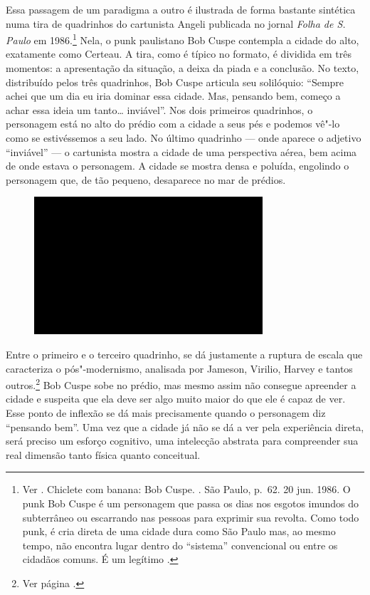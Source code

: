 Essa passagem de um paradigma a outro é ilustrada de forma bastante
sintética numa tira de quadrinhos do cartunista Angeli publicada no
jornal \emph{Folha de S. Paulo} em 1986.\footnote{Ver . Chiclete
  com banana: Bob Cuspe. {}. São Paulo, p.~62.
  20 jun. 1986. O punk Bob Cuspe é um personagem que passa os dias nos
  esgotos imundos do subterrâneo ou escarrando nas pessoas para exprimir
  sua revolta. Como todo punk, é cria direta de uma cidade dura como São
  Paulo mas, ao mesmo tempo, não encontra lugar dentro do ``sistema''
  convencional ou entre os cidadãos comuns. É um legítimo
  {}.} Nela, o punk paulistano Bob Cuspe contempla a cidade
do alto, exatamente como Certeau. A tira, como é típico no formato, é
dividida em três momentos: a apresentação da situação, a deixa da piada
e a conclusão. No texto, distribuído pelos três quadrinhos, Bob Cuspe
articula seu solilóquio: ``Sempre achei que um dia eu iria dominar essa
cidade. Mas, pensando bem, começo a achar essa ideia um
tanto\ldots{} inviável''. Nos dois primeiros quadrinhos, o personagem
está no alto do prédio com a cidade a seus pés e podemos vê"-lo como se
estivéssemos a seu lado. No último quadrinho --- onde aparece o adjetivo
``inviável'' --- o cartunista mostra a cidade de uma perspectiva aérea,
bem acima de onde estava o personagem. A cidade se mostra densa e
poluída, engolindo o personagem que, de tão pequeno, desaparece no mar
de prédios.

\begin{figure}[!ht]

\centering
 \includegraphics[width=85mm]{./imgs/im1.jpg}
\caption{\tiny{}}

\end{figure}

Entre o primeiro e o terceiro quadrinho, se dá justamente a ruptura de
escala que caracteriza o pós"-modernismo, analisada por Jameson, Virilio,
Harvey e tantos outros.\footnote{Ver página \pageref{ruptura}.} Bob Cuspe sobe no prédio, mas mesmo assim não
consegue apreender a cidade e suspeita que ela deve ser algo muito maior
do que ele é capaz de ver. Esse ponto de inflexão se dá mais
precisamente quando o personagem diz ``pensando bem''. Uma vez que a
cidade já não se dá a ver pela experiência direta, será preciso um
esforço cognitivo, uma intelecção abstrata para compreender sua real
dimensão tanto física quanto conceitual.

